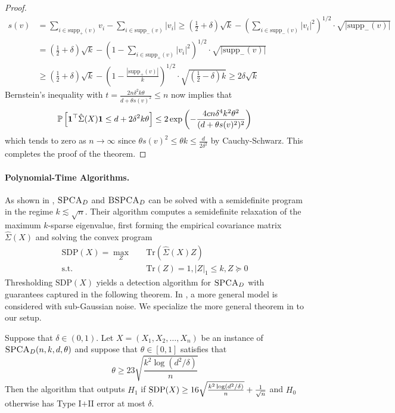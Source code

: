\begin{proof}
\begin{align*}
s(v) &= \sum_{i \in \text{supp}_+(v)} v_i - \sum_{i \in \text{supp}_-(v)} |v_i| \ge \left( \frac{1}{2} + \delta \right)\sqrt{k} - \left( \sum_{i \in \text{supp}_-(v)} |v_i|^2 \right)^{1/2} \cdot \sqrt{|\text{supp}_-(v)|} \\
&= \left( \frac{1}{2} + \delta \right)\sqrt{k} - \left( 1 - \sum_{i \in \text{supp}_+(v)} |v_i|^2 \right)^{1/2} \cdot \sqrt{|\text{supp}_-(v)|} \\
&\ge \left( \frac{1}{2} + \delta \right)\sqrt{k} - \left( 1 - \frac{|\text{supp}_+(v)|}{k} \right)^{1/2} \cdot \sqrt{\left( \frac{1}{2} - \delta \right)k} \ge 2 \delta \sqrt{k}
\end{align*}
Bernstein's inequality with $t = \frac{2n \delta^2 k \theta}{d + \theta s(v)^2} \le n$ now implies that
$$\mathbb{P}\left[ \mathbf{1}^\top \hat{\Sigma}(X) \mathbf{1} \le d + 2\delta^2 k \theta \right] \le 2 \exp\left( - \frac{4cn \delta^4 k^2 \theta^2}{(d + \theta s(v)^2)^2} \right)$$
which tends to zero as $n \to \infty$ since $\theta s(v)^2 \le \theta k \le \frac{d}{2\delta^2}$ by Cauchy-Schwarz. This completes the proof of the theorem.
\end{proof}

\paragraph{Polynomial-Time Algorithms.} As shown in \cite{berthet2013complexity}, $\textsc{SPCA}_D$ and $\textsc{BSPCA}_D$ can be solved with a semidefinite program in the regime $k \lesssim \sqrt{n}$. Their algorithm computes a semidefinite relaxation of the maximum $k$-sparse eigenvalue, first forming the empirical covariance matrix $\hat{\Sigma}(X)$ and solving the convex program
\begin{align*}
\text{SDP}(X) = \max_Z \quad &\text{Tr}\left(\hat{\Sigma}(X) Z\right) \\
\text{s.t.} \quad &\text{Tr}(Z) = 1, |Z|_1 \le k, Z \succeq 0
\end{align*}
Thresholding $\text{SDP}(X)$ yields a detection algorithm for $\textsc{SPCA}_D$ with guarantees captured in the following theorem. In \cite{berthet2013complexity}, a more general model is considered with sub-Gaussian noise. We specialize the more general theorem in \cite{berthet2013complexity} to our setup.

\begin{theorem}
Suppose that $\delta \in (0, 1)$. Let $X = (X_1, X_2, \dots, X_n)$ be an instance of $\textsc{SPCA}_D(n, k, d, \theta)$ and suppose that $\theta \in [0, 1]$ satisfies that
$$\theta \ge 23 \sqrt{\frac{k^2 \log(d^2/\delta)}{n}}$$
Then the algorithm that outputs $H_1$ if $\textnormal{SDP}(X) \ge 16 \sqrt{\frac{k^2 \log(d^2/\delta)}{n}} + \frac{1}{\sqrt{n}}$ and $H_0$ otherwise has Type I$+$II error at most $\delta$.
\end{theorem}

